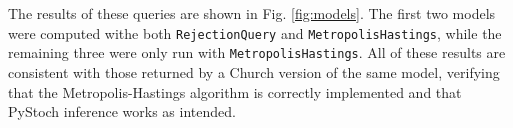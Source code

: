 \documentclass[12pt,letterpaper]{article}
\begin{document}
The results of these queries are shown in Fig. \ref{fig:models}.  The
first two models were computed withe both \texttt{RejectionQuery} and
\texttt{MetropolisHastings}, while the remaining three were only run
with \texttt{MetropolisHastings}.  All of these results are consistent
with those returned by a Church version of the same model, verifying
that the Metropolis-Hastings algorithm is correctly implemented and
that PyStoch inference works as intended.

\begin{figure}
\centering
{}
\hspace{40pt}


\end{figure}
\end{document}
